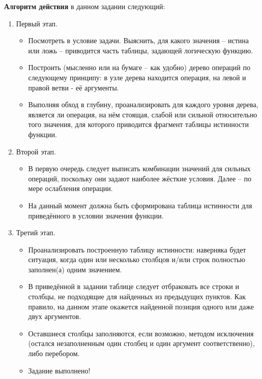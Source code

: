 \textbf{Алгоритм действия} в данном задании следующий:
\begin{enumerate}
	\item Первый этап.
	\begin{itemize}
		\item Посмотреть в условие задачи. Выяснить, для какого значения -- истина или ложь -- приводится часть таблицы, задающей логическую функцию.
		\item Построить (мысленно или на бумаге -- как удобно) дерево операций по следующему принципу: в узле дерева находится операция, на левой и правой ветви - её аргументы.
		\item Выполняя обход в глубину, проанализировать для каждого уровня дерева, является ли операция, на нём стоящая, слабой или сильной относительно того значения, для которого приводится фрагмент таблицы истинности функции.
	\end{itemize}
	\item Второй этап.
	\begin{itemize}
		\item В первую очередь следует выписать комбинации значений для сильных операций, поскольку они задают наиболее жёсткие условия. Далее -- по мере ослабления операции.
		\item На данный момент должна быть сформирована таблица истинности для приведённого в условии значения функции.
	\end{itemize}
	\item Третий этап.
	\begin{itemize}
		\item Проанализировать построенную таблицу истинности: наверняка будет ситуация, когда один или несколько столбцов и/или строк полностью заполнен(а) одним значением.
		\item В приведённой в задании таблице следует отбраковать все строки и столбцы, не подходящие для найденных из предыдущих пунктов. Как правило, на данном этапе окажется найденной позиция одного или даже двух аргументов.
		\item Оставшиеся столбцы заполняются, если возможно, методом исключения (остался незаполненным один столбец и один аргумент соответственно), либо перебором. 
		\item Задание выполнено!
	\end{itemize}
\end{enumerate}